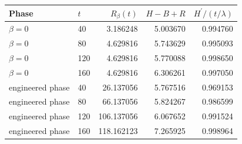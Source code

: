 \begin{tabular}{@{}llrrr@{}}
\toprule
Phase & $t$ & $R_\beta(t)$ & $H-B+R$ & $H^\prime/(t/\lambda)$ \\
\midrule
$\beta=0$ & 40 & 3.186248 & 5.003670 & 0.994760 \\
$\beta=0$ & 80 & 4.629816 & 5.743629 & 0.995093 \\
$\beta=0$ & 120 & 4.629816 & 5.770088 & 0.998650 \\
$\beta=0$ & 160 & 4.629816 & 6.306261 & 0.997050 \\
engineered phase & 40 & 26.137056 & 5.767516 & 0.969153 \\
engineered phase & 80 & 66.137056 & 5.824267 & 0.986599 \\
engineered phase & 120 & 106.137056 & 6.067652 & 0.991524 \\
engineered phase & 160 & 118.162123 & 7.265925 & 0.998964 \\
\bottomrule
\end{tabular}
